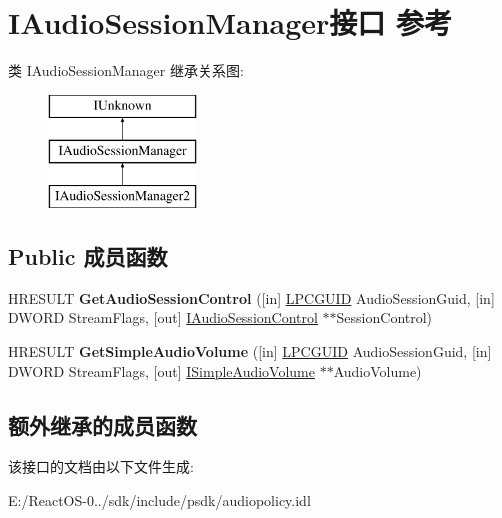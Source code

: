 \hypertarget{interface_i_audio_session_manager}{}\section{I\+Audio\+Session\+Manager接口 参考}
\label{interface_i_audio_session_manager}
类 I\+Audio\+Session\+Manager 继承关系图\+:\begin{figure}[H]
\begin{center}
\leavevmode
\includegraphics[height=3.000000cm]{interface_i_audio_session_manager}
\end{center}
\end{figure}
\subsection*{Public 成员函数}
\begin{DoxyCompactItemize}
\item 
\mbox{\label{interface_i_audio_session_manager_a2edb911dc81662211cc4201afa248d6a}} 
H\+R\+E\+S\+U\+LT {\bfseries Get\+Audio\+Session\+Control} (\mbox{[}in\mbox{]} \hyperlink{interface_g_u_i_d}{L\+P\+C\+G\+U\+ID} Audio\+Session\+Guid, \mbox{[}in\mbox{]} D\+W\+O\+RD Stream\+Flags, \mbox{[}out\mbox{]} \hyperlink{interface_i_audio_session_control}{I\+Audio\+Session\+Control} $\ast$$\ast$Session\+Control)
\item 
\mbox{\label{interface_i_audio_session_manager_ad85334a608d1775b3bf3bca4edcc82c0}} 
H\+R\+E\+S\+U\+LT {\bfseries Get\+Simple\+Audio\+Volume} (\mbox{[}in\mbox{]} \hyperlink{interface_g_u_i_d}{L\+P\+C\+G\+U\+ID} Audio\+Session\+Guid, \mbox{[}in\mbox{]} D\+W\+O\+RD Stream\+Flags, \mbox{[}out\mbox{]} \hyperlink{interface_i_simple_audio_volume}{I\+Simple\+Audio\+Volume} $\ast$$\ast$Audio\+Volume)
\end{DoxyCompactItemize}
\subsection*{额外继承的成员函数}


该接口的文档由以下文件生成\+:\begin{DoxyCompactItemize}
\item 
E\+:/\+React\+O\+S-\/0../sdk/include/psdk/audiopolicy.\+idl\end{DoxyCompactItemize}
